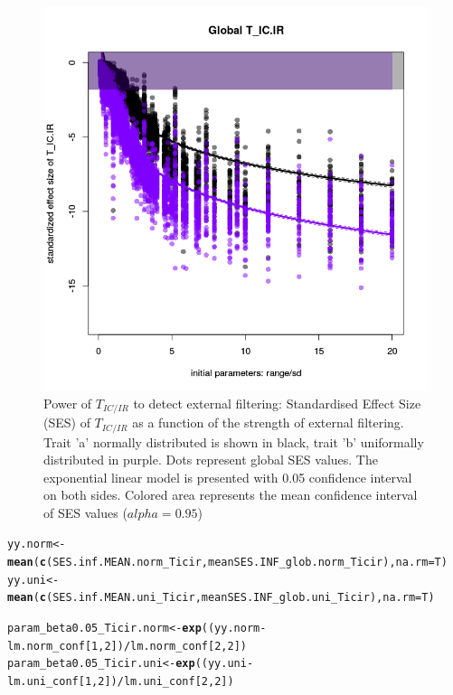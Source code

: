 \documentclass[12pt]{article}\usepackage[]{graphicx}\usepackage[]{color}
\makeatletter
\def\maxwidth{ %
  \ifdim\Gin@nat@width>\linewidth
    \linewidth
  \else
    \Gin@nat@width
  \fi
}
\newcommand{\hlnum}[1]{\textcolor[rgb]{0.686,0.059,0.569}{#1}}%
\newcommand{\hlopt}[1]{\textcolor[rgb]{0,0,0}{#1}}%
\newcommand{\hlstd}[1]{\textcolor[rgb]{0.345,0.345,0.345}{#1}}%
\newcommand{\hlkwb}[1]{\textcolor[rgb]{0.69,0.353,0.396}{#1}}%
\newcommand{\hlkwc}[1]{\textcolor[rgb]{0.333,0.667,0.333}{#1}}%
\newcommand{\hlkwd}[1]{\textcolor[rgb]{0.737,0.353,0.396}{\textbf{#1}}}%
\newenvironment{kframe}{%
 \def\at@end@of@kframe{}%
 \ifinner\ifhmode%
  \def\at@end@of@kframe{\end{minipage}}%
  \begin{minipage}{\columnwidth}%
 \fi\fi%
 \def\FrameCommand##1{\hskip\@totalleftmargin \hskip-\fboxsep
 \colorbox{shadecolor}{##1}\hskip-\fboxsep
     \hskip-\linewidth \hskip-\@totalleftmargin \hskip\columnwidth}%
 \MakeFramed {\advance\hsize-\width
   \@totalleftmargin\z@ \linewidth\hsize
   \@setminipage}}%
 {\par\unskip\endMakeFramed%
 \at@end@of@kframe}
\newenvironment{knitrout}{}{} %
\makeatother
\begin{document}
\begin{knitrout}
\begin{figure}
{\centering \includegraphics[width=\maxwidth]{figure/Ex_conc_plot1-1} 

}

\caption[Power of $T_{IC/IR}$ to detect external filtering]{Power of $T_{IC/IR}$ to detect external filtering: Standardised Effect Size (SES) of $T_{IC/IR}$ as a function of the strength of external filtering. Trait 'a' normally distributed is shown in black, trait 'b' uniformally distributed in purple. Dots represent global SES values. The exponential linear model is presented with 0.05 confidence interval on both sides. Colored area represents the mean confidence interval of SES values ($alpha = 0.95$)}\label{fig:Ex_conc_plot1}
\end{figure}


\end{knitrout}

\begin{knitrout}\small
{}\color{fgcolor}\begin{kframe}
\begin{alltt}
\hlstd{yy.norm} \hlkwb{<-} \hlkwd{mean}\hlstd{(}\hlkwd{c}\hlstd{(SES.inf.MEAN.norm_Ticir, meanSES.INF_glob.norm_Ticir),} \hlkwc{na.rm} \hlstd{= T)}
\hlstd{yy.uni} \hlkwb{<-} \hlkwd{mean}\hlstd{(}\hlkwd{c}\hlstd{(SES.inf.MEAN.uni_Ticir, meanSES.INF_glob.uni_Ticir),} \hlkwc{na.rm} \hlstd{= T)}

\hlstd{param_beta0.05_Ticir.norm} \hlkwb{<-} \hlkwd{exp}\hlstd{((yy.norm} \hlopt{-} \hlstd{lm.norm_conf[}\hlnum{1}\hlstd{,} \hlnum{2}\hlstd{])} \hlopt{/} \hlstd{lm.norm_conf[}\hlnum{2}\hlstd{,} \hlnum{2}\hlstd{])}
\hlstd{param_beta0.05_Ticir.uni} \hlkwb{<-} \hlkwd{exp}\hlstd{((yy.uni} \hlopt{-} \hlstd{lm.uni_conf[}\hlnum{1}\hlstd{,} \hlnum{2}\hlstd{])} \hlopt{/} \hlstd{lm.uni_conf[}\hlnum{2}\hlstd{,} \hlnum{2}\hlstd{])}
\end{alltt}
\end{kframe}
\end{knitrout}
\end{document}

